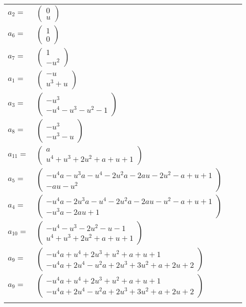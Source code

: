 \documentclass[1p]{elsarticle_modified}
\theoremstyle{definition}
\begin{document}
\begin{tabular}{m{7pt} m{180pt} m{7pt} m{180pt} }
\flushright $a_{2}=$&$\begin{pmatrix}0\\u\end{pmatrix}$ \\
\flushright $a_{6}=$&$\begin{pmatrix}1\\0\end{pmatrix}$ \\
\flushright $a_{7}=$&$\begin{pmatrix}1\\- u^2\end{pmatrix}$ \\
\flushright $a_{1}=$&$\begin{pmatrix}- u\\u^3+u\end{pmatrix}$ \\
\flushright $a_{3}=$&$\begin{pmatrix}- u^3\\- u^4- u^3- u^2-1\end{pmatrix}$ \\
\flushright $a_{8}=$&$\begin{pmatrix}- u^3\\- u^3- u\end{pmatrix}$ \\
\flushright $a_{11}=$&$\begin{pmatrix}a\\u^4+u^3+2 u^2+a+u+1\end{pmatrix}$ \\
\flushright $a_{5}=$&$\begin{pmatrix}- u^4 a- u^3 a- u^4-2 u^2 a-2 a u-2 u^2- a+u+1\\- a u- u^2\end{pmatrix}$ \\
\flushright $a_{4}=$&$\begin{pmatrix}- u^4 a-2 u^3 a- u^4-2 u^2 a-2 a u- u^2- a+u+1\\- u^3 a-2 a u+1\end{pmatrix}$ \\
\flushright $a_{10}=$&$\begin{pmatrix}- u^4- u^3-2 u^2- u-1\\u^4+u^3+2 u^2+a+u+1\end{pmatrix}$ \\
\flushright $a_{9}=$&$\begin{pmatrix}- u^4 a+u^4+2 u^3+u^2+a+u+1\\- u^4 a+2 u^4- u^2 a+2 u^3+3 u^2+a+2 u+2\end{pmatrix}$\\ \flushright $a_{9}=$&$\begin{pmatrix}- u^4 a+u^4+2 u^3+u^2+a+u+1\\- u^4 a+2 u^4- u^2 a+2 u^3+3 u^2+a+2 u+2\end{pmatrix}$\\&\end{tabular}
\end{document}
